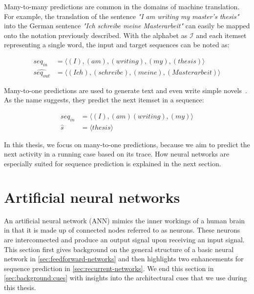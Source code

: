 Many-to-many predictions are common in the domains of machine translation. For example, the translation of the sentence \textit{"I am writing my master's thesis"} into the German sentence \textit{"Ich schreibe meine Masterarbeit"} can easily be mapped onto the notation previously described. With the alphabet as $\mathscr{I}$ and each itemset representing a single word, the input and target sequences can be noted as:

\begin{equation*}
\begin{split}
           seq_{in} &= \langle(I),(am),(writing),(my),(thesis)\rangle\\
\widehat{seq_{out}} &= \langle(Ich),(schreibe),(meine),(Masterarbeit)\rangle
\end{split}
\end{equation*}

Many-to-one predictions are used to generate text and even write simple novels~\cite{web:text-generation-machinelearningmastery, web:text-generation-freecodecamp}. As the name suggests, they predict the next itemset in a sequence:

\begin{equation*}
\begin{split}
seq_{in}  &= \langle(I),(am) (writing),(my)\rangle\\
\hat{s} &= \langle thesis\rangle
\end{split}
\end{equation*}

In this thesis, we focus on many-to-one predictions, because we aim to predict the next activity in a running case based on its trace. How neural networks are especially suited for sequence prediction is explained in the next section.

\section{Artificial neural networks}\label{sec:artificial-neural-networks}
An artificial neural network (ANN) mimics the inner workings of a human brain in that it is made up of connected nodes referred to as neurons. These neurons are interconnected and produce an output signal upon receiving an input signal. This section first gives background on the general structure of a basic neural network in \autoref{sec:feedforward-networks} and then highlights two enhancements for sequence prediction in \autoref{sec:recurrent-networks}.
We end this section in \autoref{sec:background:cues} with insights into the architectural cues that we use during this thesis.

